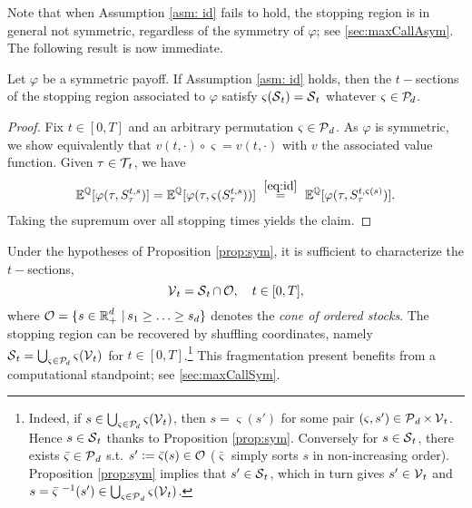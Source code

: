 Note that when Assumption \ref{asm: id} fails to hold,  the stopping region is in general not symmetric, regardless of the symmetry of $\varphi$; see \cref{sec:maxCallAsym}. 
The following result is now immediate.
\begin{proposition}
\label{prop:sym} Let $\varphi$
 be a symmetric payoff. If Assumption \ref{asm: id} holds, then the $t-$sections of the stopping region associated to $\varphi$ satisfy
$\varsigma(\operatorname{\mathcal{S}}_t)= \operatorname{\mathcal{S}}_t$ whatever $ \varsigma \in \operatorname{\mathcal{P}}_{\!d}$.
\end{proposition}
\begin{proof} Fix $t \in [0,T]$ and an arbitrary permutation $\varsigma \in \operatorname{\mathcal{P}}_d$. As $\varphi$ is symmetric, we show equivalently that $v(t,\cdot) \circ \varsigma =v(t,\cdot)$ with $v$ the associated value function. 
Given $\tau \in \operatorname{\mathcal{T}}_{\!t}$, we have
\begin{align*}\label{eq:proofSym}
    \E^{\Q}[\varphi(\tau,S^{t,s}_\tau)] =  \E^{\Q}[\varphi(\tau,\varsigma(S^{t,s}_\tau))] \
    \overset{\eqref{eq:id}}{=} \ \E^{\Q}[\varphi(\tau,S^{t,\varsigma(s)}_\tau)].
\end{align*}
Taking the supremum over all stopping times %
yields the claim.
\end{proof}
Under the hypotheses of Proposition \ref{prop:sym}, it is sufficient to characterize the $t-$sections,  
$$\operatorname{\mathcal{V}}_t= \operatorname{\mathcal{S}}_t \cap \operatorname{\mathcal{O}}, \quad t \in [0,T], $$ where $\operatorname{\mathcal{O}} = \{s\in \operatorname{\mathbb{R}}_+^d \,|\, s_1 \geq \ldots \geq s_d\}$ denotes the \textit{cone of ordered stocks}. The stopping region can be recovered by shuffling coordinates, namely $\operatorname{\mathcal{S}}_t = \bigcup_{\varsigma \in \operatorname{\mathcal{P}}_{\!d}} \varsigma(\operatorname{\mathcal{V}}_t)$ for $t\in[0,T]$.\footnote{Indeed, if $s\in  \bigcup_{\varsigma \in \operatorname{\mathcal{P}}_{\!d}} \varsigma(\operatorname{\mathcal{V}}_t)$, then $s=\varsigma(s')$ for some pair $(\varsigma,s') \in \operatorname{\mathcal{P}}_d \times \operatorname{\mathcal{V}}_t$. Hence 
$s \in \operatorname{\mathcal{S}}_t$ thanks to Proposition \ref{prop:sym}. Conversely for $s\in \operatorname{\mathcal{S}}_t$, there exists $\bar{\varsigma} \in \operatorname{\mathcal{P}}_d $ s.t. $s':=\bar{\varsigma}(s) \in \operatorname{\mathcal{O}}$ ($\bar{\varsigma}$ simply sorts  $s$ in non-increasing order). Proposition \ref{prop:sym} implies that $s' \in \operatorname{\mathcal{S}}_t$, which in turn gives   $ s' \in \operatorname{\mathcal{V}}_t$ and $s = \bar{\varsigma}^{\ -1}(s') \in \bigcup_{\varsigma \in \operatorname{\mathcal{P}}_d} \varsigma(\operatorname{\mathcal{V}}_t)$.} 
This fragmentation present benefits from a computational standpoint; see \cref{sec:maxCallSym}. 

